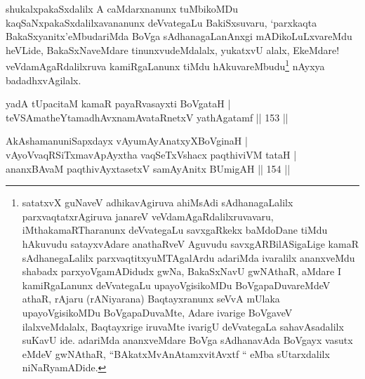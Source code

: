 \begin{artha}
shukalxpakaSxdalilx A caMdarxnanunx tuMbikoMDu kaqSaNxpakaSxdalilxavananunx deVvategaLu BakiSxsuvaru, `parxkaqta BakaSxyanitx'eMbudariMda BoVga sAdhanagaLanAnxgi mADikoLuLxvareMdu heVLide, BakaSxNaveMdare tinunxvudeMdalalx, yukatxvU alalx, EkeMdare! veVdamAgaRdalilxruva kamiRgaLanunx tiMdu hAkuvareMbudu\footnote[1]{satatxvX guNaveV adhikavAgiruva ahiMsAdi sAdhanagaLalilx parxvaqtatxrAgiruva  janareV veVdamAgaRdalilxruvavaru, iMthakamaRTharanunx deVvategaLu  savxgaRkekx baMdoDane tiMdu hAkuvudu satayxvAdare anathaRveV Aguvudu  savxgARBilASigaLige kamaR sAdhanegaLalilx parxvaqtitxyuMTAgalArdu  adariMda ivaralilx ananxveMdu shabadx parxyoVgamADidudx gwNa,  BakaSxNavU gwNAthaR, aMdare I kamiRgaLanunx deVvategaLu  upayoVgisikoMDu BoVgapaDuvareMdeV athaR, rAjaru (rANiyarana)  Baqtayxranunx seVvA mUlaka upayoVgisikoMDu BoVgapaDuvaMte, Adare  ivarige BoVgaveV ilalxveMdalalx, Baqtayxrige iruvaMte ivarigU  deVvategaLa sahavAsadalilx suKavU ide. adariMda ananxveMdare BoVga  sAdhanavAda BoVgayx vasutx eMdeV gwNAthaR, ``BAkatxMvA\s  nAtamxvitAvxtf `` eMba sUtarxdalilx niNaRyamADide.} nAyxya badadhxvAgilalx.
\end{artha}


\begin{shl}
yadA tUpacitaM kamaR payaRvasayxti BoVgataH | \\
teVSAmatheYtamadhAvxnamAvataRnetxV yathAgatamf \hfill|| 153 || 
\end{shl}

\begin{shl}
AkAshamanuniSapxdayx vAyumAyAnatxyX\footnotemark[2]BoVginaH | \\
vAyoVvaqRSiTxmavApAyxtha vaqSeTxVshacx paqthiviVM tataH | \\
ananxBAvaM paqthivAyx\s tasetxV samAyAnitx BUmigAH \hfill|| 154 || 
\end{shl}


